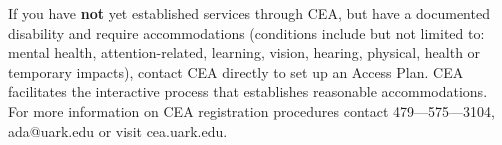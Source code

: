 \documentclass[12pt]{article}
\begin{document}
If you have \textbf{not} yet established services through CEA, but have a documented disability and require accommodations (conditions include but not limited to: mental health, attention-related, learning, vision, hearing, physical, health  or temporary impacts), contact CEA directly to set up an Access Plan. CEA facilitates the interactive process that establishes reasonable accommodations.  For more information on CEA registration procedures contact 479—575—3104, ada@uark.edu or visit cea.uark.edu.
\end{document}
